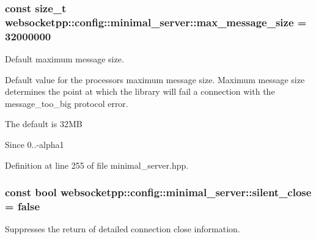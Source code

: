 \subsubsection[{\texorpdfstring{max\+\_\+message\+\_\+size}{max\_message\_size}}]{\setlength{\rightskip}{0pt plus 5cm}const size\+\_\+t websocketpp\+::config\+::minimal\+\_\+server\+::max\+\_\+message\+\_\+size = 32000000\hspace{0.3cm}{\ttfamily [static]}}\hypertarget{structwebsocketpp_1_1config_1_1minimal__server_adfad5099419b8e2090c3667d17e10008}{}\label{structwebsocketpp_1_1config_1_1minimal__server_adfad5099419b8e2090c3667d17e10008}


Default maximum message size. 

Default value for the processor\textquotesingle{}s maximum message size. Maximum message size determines the point at which the library will fail a connection with the message\+\_\+too\+\_\+big protocol error.

The default is 32\+MB

\begin{DoxySince}{Since}
0..-\/alpha1 
\end{DoxySince}


Definition at line 255 of file minimal\+\_\+server.\+hpp.

\subsubsection[{\texorpdfstring{silent\+\_\+close}{silent\_close}}]{\setlength{\rightskip}{0pt plus 5cm}const bool websocketpp\+::config\+::minimal\+\_\+server\+::silent\+\_\+close = false\hspace{0.3cm}{\ttfamily [static]}}\hypertarget{structwebsocketpp_1_1config_1_1minimal__server_a2628ceea7ff3671afac22317f979e9c1}{}\label{structwebsocketpp_1_1config_1_1minimal__server_a2628ceea7ff3671afac22317f979e9c1}


Suppresses the return of detailed connection close information. 

